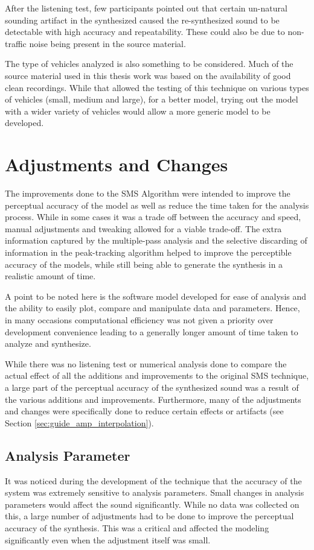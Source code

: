 After the listening test, few participants pointed out that certain un-natural sounding artifact in the synthesized caused the re-synthesized sound to be detectable with high accuracy and repeatability. These could also be due to non-traffic noise being present in the source material.

The type of vehicles analyzed is also something to be considered. Much of the source material used in this thesis work was based on the availability of good clean recordings. While that allowed the testing of this technique on various types of vehicles (small, medium and large), for a better model, trying out the model with a wider variety of vehicles would allow a more generic model to be developed.

\section{Adjustments and Changes}
The improvements done to the SMS Algorithm were intended to improve the perceptual accuracy of the model as well as reduce the time taken for the analysis process. While in some cases it was a trade off between the accuracy and speed, manual adjustments and tweaking allowed for a viable trade-off. The extra information captured by the multiple-pass analysis and the selective discarding of information in the peak-tracking algorithm helped to improve the perceptible accuracy of the models, while still being able to generate the synthesis in a realistic amount of time. 

A point to be noted here is the software model developed for ease of analysis and the ability to easily plot, compare and manipulate data and parameters. Hence, in many occasions computational efficiency was not given a priority over development convenience leading to a generally longer amount of time taken to analyze and synthesize.

While there was no listening test or numerical analysis done to compare the actual effect of all the additions and improvements to the original SMS technique, a large part of the perceptual accuracy of the synthesized sound was a result of the various additions and improvements. Furthermore, many of the adjustments and changes were specifically done to reduce certain effects or artifacts (see Section \ref{sec:guide_amp_interpolation}). 

\subsection{Analysis Parameter}
\label{sec:disc_parameters}
It was noticed during the development of the technique that the accuracy of the system was extremely sensitive to analysis parameters. Small changes in analysis parameters would affect the sound significantly. While no data was collected on this, a large number of adjustments had to be done to improve the perceptual accuracy of the synthesis. This was a critical and affected the modeling significantly even when the adjustment itself was small.

